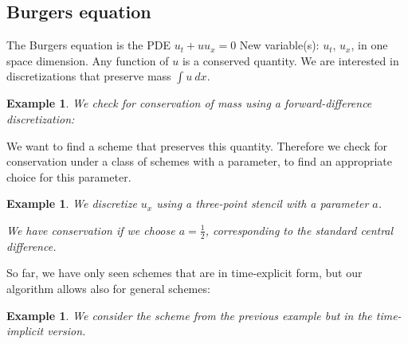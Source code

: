 \documentclass[sigconf,twocolumn]{acmart}
\newcommand{\1}{{\chi}}
\numberwithin{equation}{section}
\theoremstyle{thmlemcorr}
\numberwithin{theorem}{section}
\theoremstyle{thmlemcorr*}
\theoremstyle{defi}
\theoremstyle{remexample}
\newtheorem{example}[theorem]{Example}
\theoremstyle{ass}
\begin{document}
\subsection*{Burgers equation}
The Burgers equation is the PDE \(u_t+uu_x=0\)
{\color{blue} New variable(s): \(u_t\), \(u_x\),  }
 \cite{smoller94} in one space dimension. Any function of \(u\) is a conserved quantity. We are interested in discretizations that preserve mass \(\int u\ dx\).
\begin{example}
	We check for conservation of mass using a forward-difference discretization:
	
	\begin{small}
		
		
	\end{small}
\end{example}
We want to find a scheme that preserves this quantity. Therefore we check for conservation under a class of schemes with a parameter, to find an appropriate choice for this parameter.
\begin{example}
	We discretize \(u_x\) using a three-point stencil with a parameter \(a\).
	
	\begin{small}
		
		
	\end{small}
	We have conservation if we choose \(a=\frac{1}{2}\), corresponding to the standard central difference.
\end{example}
So far, we have only seen schemes that are in time-explicit form, but our algorithm allows also for general schemes:
\begin{example}
	We consider the scheme from the previous example but in the time-implicit version.
	
	\begin{small}
		
		
	\end{small}
\end{example}
\end{document}

